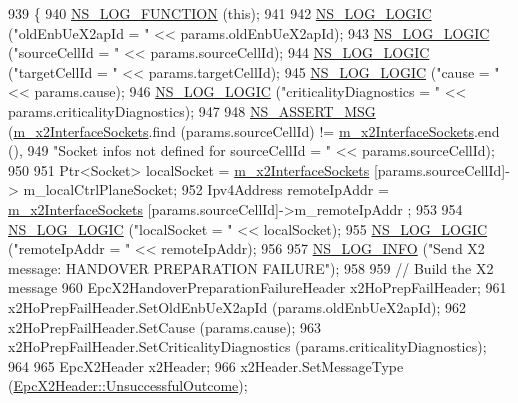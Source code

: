 \begin{DoxyCode}
939 \{
940   \hyperlink{log-macros-disabled_8h_a90b90d5bad1f39cb1b64923ea94c0761}{NS\_LOG\_FUNCTION} (\textcolor{keyword}{this});
941 
942   \hyperlink{group__logging_ga88acd260151caf2db9c0fc84997f45ce}{NS\_LOG\_LOGIC} (\textcolor{stringliteral}{"oldEnbUeX2apId = "} << params.oldEnbUeX2apId);
943   \hyperlink{group__logging_ga88acd260151caf2db9c0fc84997f45ce}{NS\_LOG\_LOGIC} (\textcolor{stringliteral}{"sourceCellId = "} << params.sourceCellId);
944   \hyperlink{group__logging_ga88acd260151caf2db9c0fc84997f45ce}{NS\_LOG\_LOGIC} (\textcolor{stringliteral}{"targetCellId = "} << params.targetCellId);
945   \hyperlink{group__logging_ga88acd260151caf2db9c0fc84997f45ce}{NS\_LOG\_LOGIC} (\textcolor{stringliteral}{"cause = "} << params.cause);
946   \hyperlink{group__logging_ga88acd260151caf2db9c0fc84997f45ce}{NS\_LOG\_LOGIC} (\textcolor{stringliteral}{"criticalityDiagnostics = "} << params.criticalityDiagnostics);
947 
948   \hyperlink{assert_8h_aff5ece9066c74e681e74999856f08539}{NS\_ASSERT\_MSG} (\hyperlink{classns3_1_1EpcX2_a0665276228b9b99a52ef6d5e9bdb306d}{m\_x2InterfaceSockets}.find (params.sourceCellId) != 
      \hyperlink{classns3_1_1EpcX2_a0665276228b9b99a52ef6d5e9bdb306d}{m\_x2InterfaceSockets}.end (),
949                  \textcolor{stringliteral}{"Socket infos not defined for sourceCellId = "} << params.sourceCellId);
950 
951   Ptr<Socket> localSocket = \hyperlink{classns3_1_1EpcX2_a0665276228b9b99a52ef6d5e9bdb306d}{m\_x2InterfaceSockets} [params.sourceCellId]->
      m\_localCtrlPlaneSocket;
952   Ipv4Address remoteIpAddr = \hyperlink{classns3_1_1EpcX2_a0665276228b9b99a52ef6d5e9bdb306d}{m\_x2InterfaceSockets} [params.sourceCellId]->m\_remoteIpAddr
      ;
953 
954   \hyperlink{group__logging_ga88acd260151caf2db9c0fc84997f45ce}{NS\_LOG\_LOGIC} (\textcolor{stringliteral}{"localSocket = "} << localSocket);
955   \hyperlink{group__logging_ga88acd260151caf2db9c0fc84997f45ce}{NS\_LOG\_LOGIC} (\textcolor{stringliteral}{"remoteIpAddr = "} << remoteIpAddr);
956 
957   \hyperlink{group__logging_gafbd73ee2cf9f26b319f49086d8e860fb}{NS\_LOG\_INFO} (\textcolor{stringliteral}{"Send X2 message: HANDOVER PREPARATION FAILURE"});
958 
959   \textcolor{comment}{// Build the X2 message}
960   EpcX2HandoverPreparationFailureHeader x2HoPrepFailHeader;
961   x2HoPrepFailHeader.SetOldEnbUeX2apId (params.oldEnbUeX2apId);
962   x2HoPrepFailHeader.SetCause (params.cause);
963   x2HoPrepFailHeader.SetCriticalityDiagnostics (params.criticalityDiagnostics);
964 
965   EpcX2Header x2Header;
966   x2Header.SetMessageType (\hyperlink{classns3_1_1EpcX2Header_a0e69b043a20eaee4c570f223f4eca715a32ae3f1f4f837ceb0b22d29a5acedaf5}{EpcX2Header::UnsuccessfulOutcome});

\end{DoxyCode}
